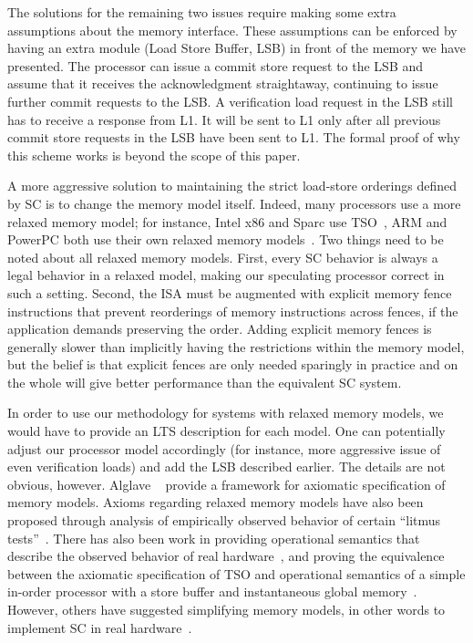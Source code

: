 The solutions for the remaining two issues require making some extra
assumptions about the memory interface. These assumptions can be enforced by
having an extra module (Load Store Buffer, LSB) in front of the memory we have
presented. The processor can issue a commit store request to the LSB and
assume that it receives the acknowledgment straightaway, continuing to issue
further commit requests to the LSB. A verification load request in the LSB
still has to receive a response from L1. It will be sent to L1 only after all
previous commit store requests in the LSB have been sent to L1. The formal
proof of why this scheme works is beyond the scope of this paper.

A more aggressive solution to maintaining the strict load-store orderings
defined by SC is to change the memory model itself. Indeed, many processors use
a more relaxed memory model; for instance, Intel x86 and Sparc use
TSO~\cite{intel64and,weaver1994sparc}, ARM and PowerPC both use their own
relaxed memory models~\cite{grisenthwaite2009arm,power2009version}.
Two things need to be noted about all relaxed memory models. First, every SC
behavior is
always a legal behavior in a relaxed model, making our speculating processor
correct in such a setting. Second, the ISA must be augmented with explicit
memory fence instructions that prevent reorderings of memory instructions
across fences, if the application demands preserving the order. Adding explicit memory fences is generally slower than implicitly
having the restrictions within the memory model, but the belief is that
explicit fences are only needed sparingly in practice and on the whole will
give better performance than the equivalent SC system.

In order to use our methodology for systems with relaxed memory models, we
would have to provide an LTS description for each model. One can potentially
adjust our processor model accordingly (for
instance, more aggressive issue of even verification loads) and add the LSB described
earlier. The details are not obvious, however. Alglave
\etal{}~\cite{alglave2012formal,alglave2014herding} provide a framework for 
axiomatic specification of memory models.  Axioms regarding relaxed memory
models have also been proposed through analysis of empirically observed behavior
of certain ``litmus tests''~\cite{mador2012axiomatic,sarkar2012synchronising}.
There has also been work in providing operational semantics that describe the
observed behavior of real hardware~\cite{sarkar2011understanding}, and proving
the equivalence between the axiomatic specification of TSO and operational
semantics of a simple in-order processor with a store buffer and instantaneous
global memory~\cite{x86tsocacm10}. However, others have suggested
simplifying memory models, in other words to implement SC in real
hardware~\cite{hill1998multiprocessors}.
